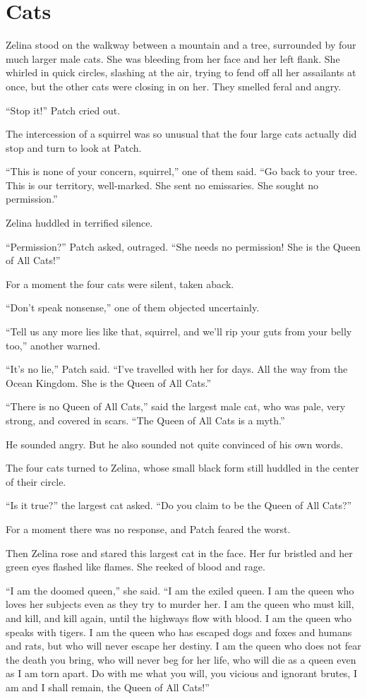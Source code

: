 \documentclass[ebook,oneside,openany,17pt]{memoir}
\renewcommand{\thechapter}{\Roman{chapter}}
\newcounter{sections}
\newcommand{\sections}[1]{%
  \section*{#1}
  \addtocounter{sections}{1}%
  \pdfbookmark[1]{#1}{section.\thechapter.\thesections}}
\begin{document}

\sections{Cats}

Zelina stood on the walkway between a mountain and a tree, surrounded
by four much larger male cats. She was bleeding from her face and her
left flank. She whirled in quick circles, slashing at the air, trying
to fend off all her assailants at once, but the other cats were
closing in on her. They smelled feral and angry.

“Stop it!” Patch cried out.

The intercession of a squirrel was so unusual that the four large cats
actually did stop and turn to look at Patch.

“This is none of your concern, squirrel,” one of them said. “Go back
to your tree. This is our territory, well-marked. She sent no
emissaries. She sought no permission.”

Zelina huddled in terrified silence.

“Permission?” Patch asked, outraged. “She needs no permission! She is
the Queen of All Cats!”

For a moment the four cats were silent, taken aback.

“Don’t speak nonsense,” one of them objected uncertainly.

“Tell us any more lies like that, squirrel, and we’ll rip your guts
from your belly too,” another warned.

“It’s no lie,” Patch said. “I’ve travelled with her for days. All the
way from the Ocean Kingdom. She is the Queen of All Cats.”

“There is no Queen of All Cats,” said the largest male cat, who was
pale, very strong, and covered in scars. “The Queen of All Cats is a
myth.”

He sounded angry. But he also sounded not quite convinced of his own
words.

The four cats turned to Zelina, whose small black form still huddled
in the center of their circle.

“Is it true?” the largest cat asked. “Do you claim to be the Queen of
All Cats?”

For a moment there was no response, and Patch feared the worst.

Then Zelina rose and stared this largest cat in the face. Her fur
bristled and her green eyes flashed like flames. She reeked of blood
and rage.

“I am the doomed queen,” she said. “I am the exiled queen. I am the
queen who loves her subjects even as they try to murder her. I am the
queen who must kill, and kill, and kill again, until the highways flow
with blood. I am the queen who speaks with tigers. I am the queen who
has escaped dogs and foxes and humans and rats, but who will never
escape her destiny. I am the queen who does not fear the death you
bring, who will never beg for her life, who will die as a queen even
as I am torn apart. Do with me what you will, you vicious and ignorant
brutes, I am and I shall remain, the Queen of All Cats!”
\end{document}
